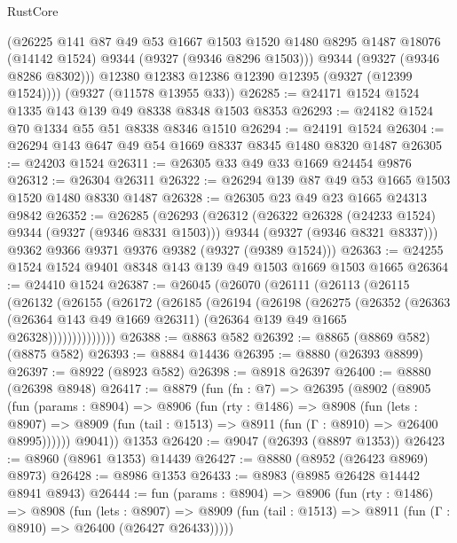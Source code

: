 \begin{lexlean}{RustCore}
\begin{coremodule}
          (@26225
            @141
            @87
            @49
            @53
            @1667
            @1503
            @1520
            @1480
            @8295
            @1487
            @18076
            (@14142 @1524)
            @9344
            (@9327 (@9346 @8296 @1503)))
          @9344
          (@9327 (@9346 @8286 @8302)))
        @12380
        @12383
        @12386
        @12390
        @12395
        (@9327 (@12399 @1524))))
    (@9327 (@11578 @13955 @33))
@26285 := @24171 @1524 @1524 @1335 @143 @139 @49 @8338 @8348 @1503 @8353
@26293 := @24182 @1524 @70 @1334 @55 @51 @8338 @8346 @1510
@26294 := @24191 @1524
@26304 := @26294 @143 @647 @49 @54 @1669 @8337 @8345 @1480 @8320 @1487
@26305 := @24203 @1524
@26311 := @26305 @33 @49 @33 @1669 @24454 @9876
@26312 := @26304 @26311
@26322 := @26294 @139 @87 @49 @53 @1665 @1503 @1520 @1480 @8330 @1487
@26328 := @26305 @23 @49 @23 @1665 @24313 @9842
@26352 := @26285
    (@26293
      (@26312
        (@26322 @26328 (@24233 @1524) @9344 (@9327 (@9346 @8331 @1503)))
        @9344
        (@9327 (@9346 @8321 @8337)))
      @9362
      @9366
      @9371
      @9376
      @9382
      (@9327 (@9389 @1524)))
@26363 := @24255 @1524 @1524 @9401 @8348 @143 @139 @49 @1503 @1669 @1503 @1665
@26364 := @24410 @1524
@26387 := @26045
    (@26070
      (@26111
        (@26113
          (@26115
            (@26132
              (@26155
                (@26172
                  (@26185
                    (@26194
                      (@26198
                        (@26275
                          (@26352
                            (@26363
                              (@26364 @143 @49 @1669 @26311)
                              (@26364 @139 @49 @1665 @26328))))))))))))))
@26388 := @8863 @582
@26392 := @8865 (@8869 @582) (@8875 @582)
@26393 := @8884 @14436
@26395 := @8880 (@26393 @8899)
@26397 := @8922 (@8923 @582)
@26398 := @8918 @26397
@26400 := @8880 (@26398 @8948)
@26417 := @8879
    (fun (fn : @7) =>
    @26395
      (@8902
        (@8905
          (fun (params : @8904) =>
          @8906
            (fun (rty : @1486) =>
            @8908
              (fun (lets : @8907) =>
              @8909 (fun (tail : @1513) => @8911 (fun (Γ : @8910) => @26400 @8995))))))
        @9041))
    @1353
@26420 := @9047 (@26393 (@8897 @1353))
@26423 := @8960 (@8961 @1353) @14439
@26427 := @8880 (@8952 (@26423 @8969) @8973)
@26428 := @8986 @1353
@26433 := @8983 (@8985 @26428 @14442 @8941 @8943)
@26444 := fun (params : @8904) =>
  @8906
    (fun (rty : @1486) =>
    @8908
      (fun (lets : @8907) =>
      @8909 (fun (tail : @1513) => @8911 (fun (Γ : @8910) => @26400 (@26427 @26433)))))

\end{coremodule}
\end{lexlean}
